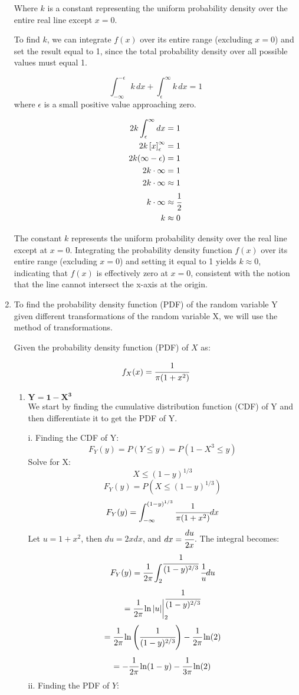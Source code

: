 \documentclass{article}
\begin{document}
\begin{enumerate}
    Where $k$ is a constant representing the uniform probability density over the entire real line except $x = 0$.

    To find $k$, we can integrate $f(x)$ over its entire range (excluding $x=0$) and set the result equal to 1, since the total probability density over all possible values must equal 1.

    \[
    \int_{-\infty}^{-\epsilon} k\,dx + \int_{\epsilon}^{\infty} k\,dx = 1
    \]
    where $\epsilon$ is a small positive value approaching zero.

    \begin{align*}
    2k\int_{\epsilon}^{\infty} dx &= 1\\
    2k\left[x\right]_{\epsilon}^{\infty} &= 1\\
    2k(\infty - \epsilon) &= 1\\
    2k \cdot \infty &= 1\\
    2k \cdot \infty &\approx 1\\
    k \cdot \infty &\approx \cfrac{1}{2}\\
    k &\approx 0
    \end{align*}

    The constant $k$ represents the uniform probability density over the real line except at $x = 0$. Integrating the probability density function $f(x)$ over its entire range (excluding $x=0$) and setting it equal to 1 yields $k \approx 0$, indicating that $f(x)$ is effectively zero at $x = 0$, consistent with the notion that the line cannot intersect the x-axis at the origin.
    
\newpage
\item
To find the probability density function (PDF) of the random variable Y given different transformations of the random variable X, we will use the method of transformations.

Given the probability density function (PDF) of \( X \) as:

\[ 
    f_X(x) = \cfrac{1}{\pi(1 + x^2)}
\]
\begin{enumerate}
    \item 
    \( \mathbf{Y = 1 - X^3}\)\\
    We start by finding the cumulative distribution function (CDF) of Y and then differentiate it to get the PDF of Y.

    i. Finding the CDF of Y:
    \[ 
        F_Y(y) = P(Y \leq y) = P(1 - X^3 \leq y) 
    \]
    Solve for X:
    \[ 
        X \leq (1 - y)^{1/3} 
    \]
    \[ 
        F_Y(y) = P(X \leq (1 - y)^{1/3}) 
    \]
    \[
        F_Y(y) = \int_{-\infty}^{(1 - y)^{1/3}} \cfrac{1}{\pi(1 + x^2)} dx
    \]
    Let $ u = 1 + x^2 $, then $ du = 2x dx $, and $ dx = \cfrac{du}{2x} $.
    The integral becomes:
    \[
        F_Y(y) = \cfrac{1}{2\pi} \int_{2}^{\cfrac{1}{(1 - y)^{2/3}}} \cfrac{1}{u} du
    \]
    \[
        = \cfrac{1}{2\pi} \ln|u| \bigg|_{2}^{\cfrac{1}{(1 - y)^{2/3}}}
    \]
    \[
        = \cfrac{1}{2\pi} \ln\left(\cfrac{1}{(1 - y)^{2/3}}\right) - \cfrac{1}{2\pi} \ln(2)
    \]
    \[
        = -\cfrac{1}{2\pi} \ln(1 - y) - \cfrac{1}{3\pi} \ln(2)
    \]
    ii. Finding the PDF of $Y$:


\end{enumerate}
\end{enumerate}
\end{document}

